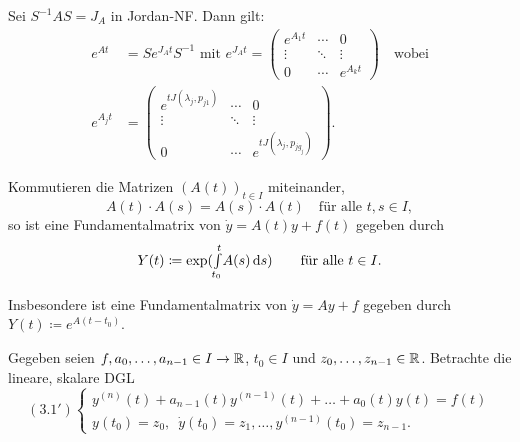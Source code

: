 \documentclass{cheat-sheet}
\begin{document}
\begin{satz}
  Sei $S^{-1} A S = J_A$ in Jordan-NF. Dann gilt:
  \begin{align*}
    e^{At} &= S e^{J_A t} S^{-1} \text{ mit } e^{J_A t} = \begin{pmatrix}
      e^{A_1 t} & \cdots & 0\\
      \vdots & \ddots & \vdots\\
      0 & \cdots & e^{A_k t}
    \end{pmatrix}
    \quad \text{wobei}\\
    e^{A_j t} &= \begin{pmatrix}
      e^{t J(\lambda_j, p_{j1})} & \cdots & 0\\
      \vdots & \ddots & \vdots\\
      0 & \cdots & e^{t J(\lambda_j, p_{j g_j})}
    \end{pmatrix}.
  \end{align*}
\end{satz}


\begin{satz}
  Kommutieren die Matrizen $(A(t))_{t \in I}$ miteinander, \dh{}
  \[ A(t) \cdot A(s) = A(s) \cdot A(t) \quad \text{für alle $t, s \in I$}, \]
  so ist eine Fundamentalmatrix von $\dot{y} = A(t) y + f(t)$ gegeben durch
  \[
    Y(t) \coloneqq \exp({\textstyle \int\limits_{t_0}^{t}} A(s) \,\mathrm{d} s)
    \qquad \text{für alle $t \in I$.}
  \]
\end{satz}

\begin{bem}
  Insbesondere ist eine Fundamentalmatrix von $\dot{y} = Ay + f$ gegeben durch $Y(t) \coloneqq e^{A (t - t_0)}$.
\end{bem}



\begin{prob}
  Gegeben seien $f, a_0, \ldots, a_{n-1} \in I \to \mathbb{R}$, $t_0 \in I$ und $z_0, \ldots, z_{n-1} \in \mathbb{R}$. Betrachte die lineare, skalare DGL
  \[
    (3.1') \left\{ \begin{array}{l}
      y^{(n)}(t) + a_{n-1}(t) y^{(n-1)}(t) + \ldots + a_0(t) y(t) = f(t)\\
      y(t_0) = z_0, \enspace \dot{y}(t_0) = z_1, \ldots, y^{(n-1)}(t_0) = z_{n-1}.
    \end{array} \right.
  \]
\end{prob}
\end{document}
